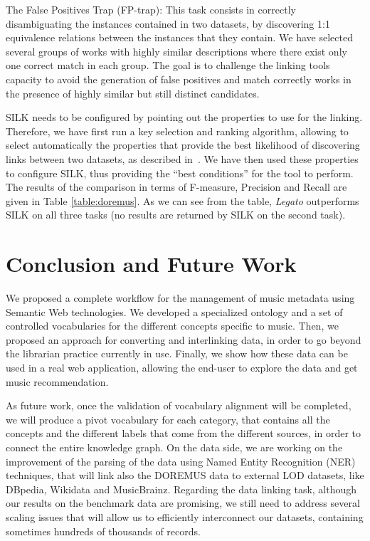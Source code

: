 The False Positives Trap (FP-trap): This task consists in correctly disambiguating the instances contained in two datasets, by discovering 1:1 equivalence relations between the instances that they contain. We have selected several groups of works with highly similar descriptions where there exist only one correct match in each group. The goal is to challenge the linking tools capacity to avoid the generation of false positives and match correctly works in the presence of highly similar but still distinct candidates.

SILK needs to be configured by pointing out the properties to use for the linking. Therefore, we have first run a key selection and ranking algorithm, allowing to select automatically the properties that provide the best likelihood of discovering links between two datasets, as described in~\cite{achichi2016automatic}. We have then used these properties to configure SILK, thus providing the ``best conditions'' for the tool to perform. The results of the comparison in terms of F-measure, Precision and Recall are given in Table \ref{table:doremus}. As we can see from the table, \textit{Legato} outperforms SILK on all three tasks (no results are returned by SILK on the second task). 


\section{Conclusion and Future Work}
\label{sec:conclusion}
We proposed a complete workflow for the management of music metadata using Semantic Web technologies. We developed a specialized ontology and a set of controlled vocabularies for the different concepts specific to music. Then, we proposed an approach for converting and interlinking data, in order to go beyond the librarian practice currently in use. Finally, we show how these data can be used in a real web application, allowing the end-user to explore the data and get music recommendation.

As future work, once the validation of vocabulary alignment will be completed, we will produce a pivot vocabulary for each category, that contains all the concepts and the different labels that come from the different sources, in order to connect the entire knowledge graph. On the data side, we are working on the improvement of the parsing of the data using Named Entity Recognition (NER) techniques, that will link also the DOREMUS data to external LOD datasets, like DBpedia, Wikidata and MusicBrainz. Regarding the data linking task, although our results on the benchmark data are promising, we still need to address several scaling issues that will allow us to efficiently interconnect our datasets, containing sometimes hundreds of thousands of records.

